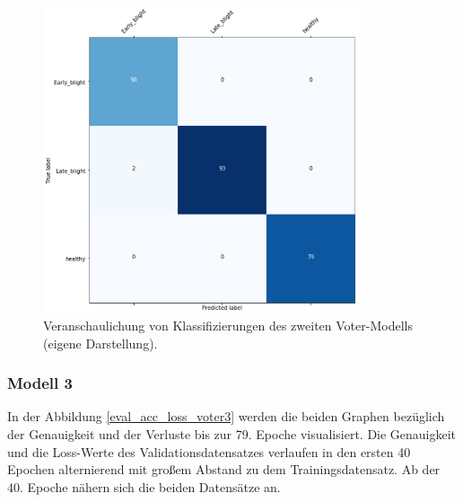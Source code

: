 \begin{figure}[h!]
	\centering
	\includegraphics[width=0.83\textwidth]{model/voter2/voter2_cm.PNG}
	\caption{Veranschaulichung von Klassifizierungen des zweiten Voter-Modells (eigene Darstellung).}
	\label{voter2_cm}
\end{figure}


\subsubsection{Modell 3}

In der Abbildung \ref{eval_acc_loss_voter3} werden die beiden Graphen bezüglich der Genauigkeit und der Verluste bis zur 79. Epoche visualisiert. Die Genauigkeit und die Loss-Werte des Validationsdatensatzes verlaufen in den ersten 40 Epochen alternierend mit großem Abstand zu dem Trainingsdatensatz. Ab der 40. Epoche nähern sich die beiden Datensätze an.

